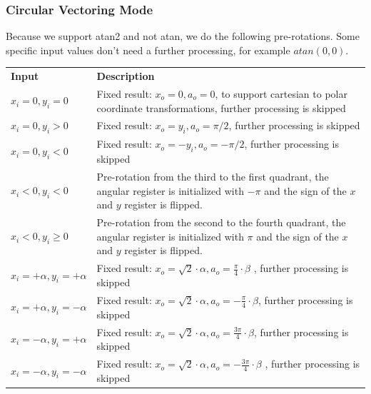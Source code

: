 \documentclass[a4paper, 12pt, notitlepage]{report}
\begin{document}
   
      \subsubsection{Circular Vectoring Mode}
      Because we support atan2 and not atan, we do the following pre-rotations. 
      Some specific input values don't need a further processing, for 
      example $atan( 0, 0 )$.\newline\newline
         \begin{tabular}{@{}lp{380pt}@{}}
            \rowcolor{tableheadcolor}\textbf{Input} &\textbf{ Description }  \\
      
            $x_i = 0, y_i = 0$    &    Fixed result: $x_o =  0, a_o = 0$,   
            to support cartesian to polar coordinate transformations, 
            further processing is skipped  \\ \midrule
      
            $x_i = 0, y_i > 0 $   &    Fixed result: $x_o =  y_i, a_o = \pi/2$,  
            further processing is skipped \\ \midrule
      
            $x_i = 0, y_i < 0 $   &    Fixed result: $x_o = -y_i, a_o = -\pi/2$,  
            further processing is skipped \\ \midrule
      
      
            $x_i < 0, y_i < 0 $   &    Pre-rotation from the third to the first quadrant,
                                       the angular register is initialized with $-\pi$ and
                                       the sign of the $x$ and $y$ register is flipped. \\ \midrule
      
            $x_i < 0, y_i \ge 0 $   &    Pre-rotation from the second to the fourth quadrant,
                                       the angular register is initialized with $\pi$ and
                                       the sign of the $x$ and $y$ register is flipped. \\ \midrule
      
      
            $x_i = + \alpha, y_i = + \alpha $   &  Fixed result: $x_o = \sqrt{2} \cdot \alpha, a_o = \frac{\pi}{4} \cdot \beta$ ,
            further processing is skipped \\ \midrule
      
            $x_i = + \alpha, y_i = - \alpha $   &  Fixed result: $x_o = \sqrt{2} \cdot \alpha, a_o = - \frac{\pi}{4} \cdot \beta$, 
            further processing is skipped \\ \midrule
      
            $x_i = - \alpha, y_i = + \alpha $   &  Fixed result: $x_o = \sqrt{2} \cdot \alpha, a_o =  \frac{3 \pi}{4} \cdot \beta$, 
            further processing is skipped \\ \midrule
      
            $x_i = - \alpha, y_i = - \alpha $   &  Fixed result: $x_o = \sqrt{2} \cdot \alpha, a_o = - \frac{3 \pi }{4} \cdot \beta$ ,
            further processing is skipped \\ 
            \bottomrule
         \end{tabular}
      
\end{document}
